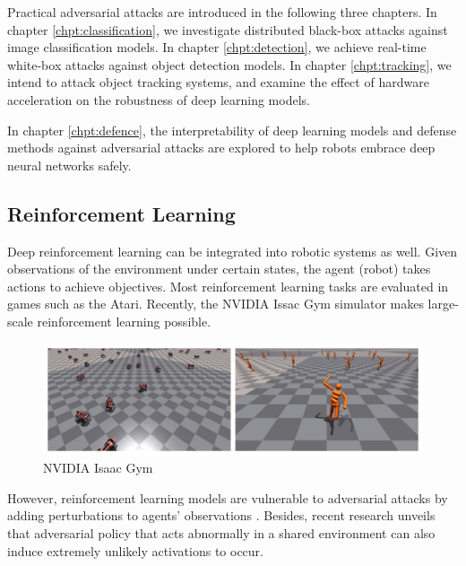 Practical adversarial attacks are introduced in the following three chapters. In chapter \ref{chpt:classification}, we investigate distributed black-box attacks against image classification models. In chapter \ref{chpt:detection}, we achieve real-time white-box attacks against object detection models. In chapter \ref{chpt:tracking}, we intend to attack object tracking systems, and examine the effect of hardware acceleration on the robustness of deep learning models. 


In chapter \ref{chpt:defence}, the interpretability of deep learning models and defense methods against adversarial attacks are explored to help robots embrace deep neural networks safely.


\subsection{Reinforcement Learning}
\label{sec:reinf_robot}

Deep reinforcement learning can be integrated into robotic systems as well. Given observations of the environment under certain states, the agent (robot) takes actions to achieve objectives. Most reinforcement learning tasks are evaluated in games such as the Atari. Recently, the NVIDIA Issac Gym simulator makes large-scale reinforcement learning possible.

\begin{figure}[H]
\centering
\includegraphics[width=\textwidth]{figures/chapter_intro/issac_gym.jpg}
\caption{NVIDIA Isaac Gym}
\label{fig.issac_gym}
\end{figure}

However, reinforcement learning models are vulnerable to adversarial attacks by adding perturbations to agents' observations \citep{chen2019adversarial}. Besides, recent research unveils that adversarial policy that acts abnormally in a shared environment can also induce extremely unlikely activations to occur.

